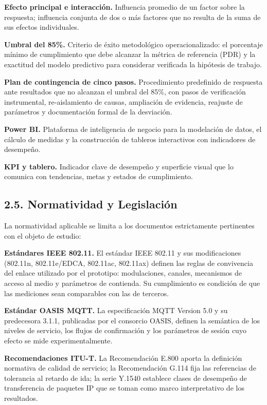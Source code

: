 \documentclass[
  12pt,
]{article}
\begin{document}
\textbf{Efecto principal e interacción.} Influencia promedio de un
factor sobre la respuesta; influencia conjunta de dos o más factores que
no resulta de la suma de sus efectos individuales.

\textbf{Umbral del 85\%.} Criterio de éxito metodológico
operacionalizado: el porcentaje mínimo de cumplimiento que debe alcanzar
la métrica de referencia (PDR) y la exactitud del modelo predictivo para
considerar verificada la hipótesis de trabajo.

\textbf{Plan de contingencia de cinco pasos.} Procedimiento predefinido
de respuesta ante resultados que no alcanzan el umbral del 85\%, con
pasos de verificación instrumental, re-aislamiento de causas, ampliación
de evidencia, reajuste de parámetros y documentación formal de la
desviación.

\textbf{Power BI.} Plataforma de inteligencia de negocio para la
modelación de datos, el cálculo de medidas y la construcción de tableros
interactivos con indicadores de desempeño.

\textbf{KPI y tablero.} Indicador clave de desempeño y superficie visual
que lo comunica con tendencias, metas y estados de cumplimiento.

\subsection{2.5. Normatividad y
Legislación}\label{normatividad-y-legislaciuxf3n}

La normatividad aplicable se limita a los documentos estrictamente
pertinentes con el objeto de estudio:

\textbf{Estándares IEEE 802.11.} El estándar IEEE 802.11 y sus
modificaciones (802.11n, 802.11e/EDCA, 802.11ac, 802.11ax) definen las
reglas de convivencia del enlace utilizado por el prototipo:
modulaciones, canales, mecanismos de acceso al medio y parámetros de
contienda. Su cumplimiento es condición de que las mediciones sean
comparables con las de terceros.

\textbf{Estándar OASIS MQTT.} La especificación MQTT Version 5.0 y su
predecesora 3.1.1, publicadas por el consorcio OASIS, definen la
semántica de los niveles de servicio, los flujos de confirmación y los
parámetros de sesión cuyo efecto se mide experimentalmente.

\textbf{Recomendaciones ITU-T.} La Recomendación E.800 aporta la
definición normativa de calidad de servicio; la Recomendación G.114 fija
las referencias de tolerancia al retardo de ida; la serie Y.1540
establece clases de desempeño de transferencia de paquetes IP que se
toman como marco interpretativo de los resultados.
\end{document}
